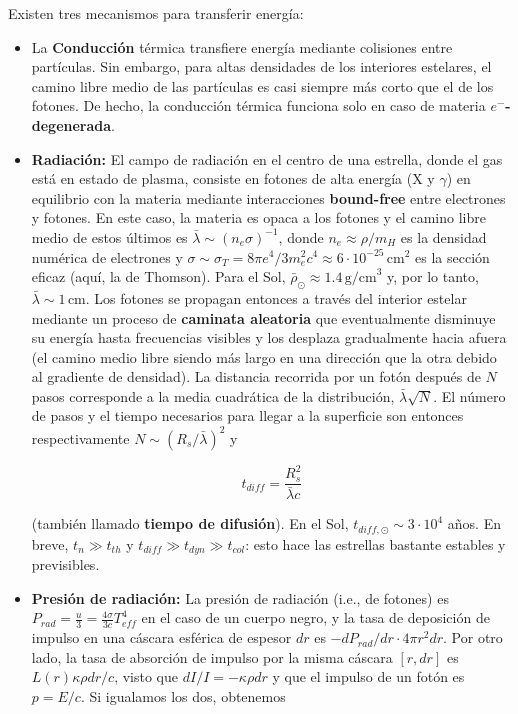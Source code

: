 \documentclass[11pt,letterpaper]{article}
\begin{document}
Existen tres mecanismos para transferir energía:
    \begin{itemize}
        \item La \textbf{Conducción} térmica transfiere energía mediante colisiones entre partículas. Sin embargo, para altas densidades de los interiores estelares, el camino libre medio de las partículas es casi siempre más corto que el de los fotones. De hecho, la conducción térmica funciona solo en caso de materia \textbf{\(e^-\)-degenerada}.
        \item \textbf{Radiación:} El campo de radiación en el centro de una estrella, donde el gas está en estado de plasma, consiste en fotones de alta energía (X y \(\gamma\)) en equilibrio con la materia mediante interacciones \textbf{bound-free} entre electrones y fotones. En este caso, la materia es opaca a los fotones y el camino libre medio de estos últimos es \(\bar{\lambda} \sim (n_e \sigma)^{-1}\), donde \(n_e \approx \rho / m_H\) es la densidad numérica de electrones y \(\sigma \sim \sigma_T = 8\pi e^4 / 3 m_e^2 c^4 \approx 6 \cdot 10^{-25} \, \text{cm}^2\) es la sección eficaz (aquí, la de Thomson). Para el Sol, \(\bar{\rho}_\odot \approx 1.4 \, \text{g/cm}^3\) y, por lo tanto, \(\bar{\lambda} \sim 1 \, \text{cm}\).
        Los fotones se propagan entonces a través del interior estelar mediante un proceso de \textbf{caminata aleatoria} que eventualmente disminuye su energía hasta frecuencias visibles y los desplaza gradualmente hacia afuera (el camino medio libre siendo más largo en una dirección que la otra debido al gradiente de densidad). La distancia recorrida por un fotón después de \(N\) pasos corresponde a la media cuadrática de la distribución, \(\bar{\lambda} \sqrt{N}\). El número de pasos y el tiempo necesarios para llegar a la superficie son entonces respectivamente \(N \sim (R_s / \bar{\lambda})^2\) y

        \begin{equation}
        t_{diff} = \frac{R_s^2}{\bar{\lambda} c}
        \end{equation}

        (también llamado \textbf{tiempo de difusión}). En el Sol, \(t_{diff, \odot} \sim 3 \cdot 10^4\) años. En breve, \(t_n \gg t_{th}\) y \(t_{diff} \gg t_{dyn} \gg t_{col}\): esto hace las estrellas bastante estables y previsibles.

        \item \textbf{Presión de radiación:} La presión de radiación (i.e., de fotones) es \(P_{rad} = \frac{u}{3} = \frac{4\sigma}{3c}T_{eff}^4\) en el caso de un cuerpo negro, y la tasa de deposición de impulso en una cáscara esférica de espesor \(dr\) es \(-dP_{rad}/dr \cdot 4\pi r^2 dr\). Por otro lado, la tasa de absorción de impulso por la misma cáscara \([r, dr]\) es \(L(r)\kappa\rho dr/c\), visto que \(dI/I = -\kappa\rho dr\) y que el impulso de un fotón es \(p = E/c\). Si igualamos los dos, obtenemos


\end{itemize}
\end{document}
